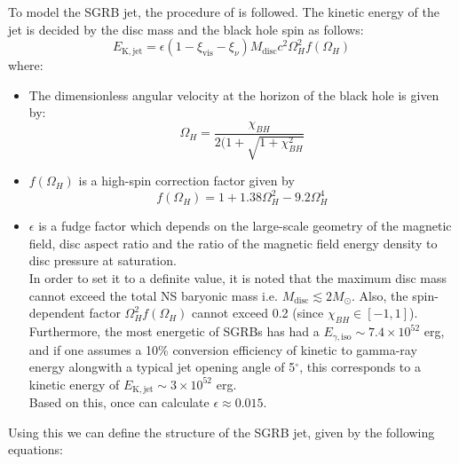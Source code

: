     To model the SGRB jet, the procedure of \cite{zhu_2020} is followed. The
    kinetic energy of the jet is decided by the disc mass and the black hole spin as
    follows:
    \begin{equation}
        E_{\mathrm{K, jet}} =
            \epsilon(1 - \xi_{\mathrm{vis}} - \xi_{\nu})
            M_{\mathrm{disc}} c^2 \Omega_H^2 f(\Omega_H)
    \end{equation}
    where:

    \begin{itemize}

        \item The dimensionless angular velocity at the horizon of the black hole is
            given by:
            \begin{equation}
                \Omega_H = \dfrac{\chi_{BH}}{2(1 + \sqrt{1 + \chi_{BH}^2}}
            \end{equation}

        \item $f(\Omega_H)$ is a high-spin correction factor given by $$f(\Omega_H) = 1
            + 1.38\Omega_H^2 - 9.2 \Omega_H^4$$

        \item $\epsilon$ is a fudge factor which depends on the large-scale geometry of
            the magnetic field, disc aspect ratio and the ratio of the magnetic field
            energy density to disc pressure at saturation.\\ In order to set it to a
            definite value, it is noted that the maximum disc mass cannot exceed the
            total NS baryonic mass i.e. $M_{\mathrm{disc}} \lesssim 2M_\odot$. Also, the
            spin-dependent factor $\Omega_H^2f(\Omega_H)$ cannot exceed 0.2 (since
            $\chi_{BH} \in [-1, 1]$). Furthermore, the most energetic of SGRBs has had a
            $E_{\gamma, \mathrm{iso}} \sim 7.4 \times 10^{52}$ erg, and if one assumes a
            10\% conversion efficiency of kinetic to gamma-ray energy alongwith a
            typical jet opening angle of 5$^{\circ}$, this corresponds to a kinetic
            energy of $E_{\mathrm{K, jet}} \sim 3 \times 10^{52}$ erg.\\
            Based on this, once can calculate $\boxed{\epsilon \approx 0.015}$.

    \end{itemize}

    Using this we can define the structure of the SGRB jet, given by the following
    equations:

